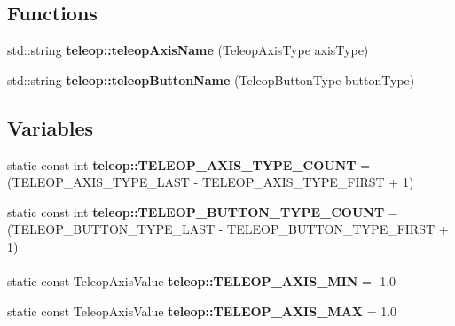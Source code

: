 \subsection*{Functions}
\begin{DoxyCompactItemize}
\item 
std::string {\bf teleop::teleopAxisName} (TeleopAxisType axisType)
\item 
std::string {\bf teleop::teleopButtonName} (TeleopButtonType buttonType)
\end{DoxyCompactItemize}
\subsection*{Variables}
\begin{DoxyCompactItemize}
\item 
static const int {\bf teleop::TELEOP\_\-AXIS\_\-TYPE\_\-COUNT} = (TELEOP\_\-AXIS\_\-TYPE\_\-LAST -\/ TELEOP\_\-AXIS\_\-TYPE\_\-FIRST + 1)
\item 
static const int {\bf teleop::TELEOP\_\-BUTTON\_\-TYPE\_\-COUNT} = (TELEOP\_\-BUTTON\_\-TYPE\_\-LAST -\/ TELEOP\_\-BUTTON\_\-TYPE\_\-FIRST + 1)
\end{DoxyCompactItemize}
\paragraph*{}
\begin{DoxyCompactItemize}
\item 
static const TeleopAxisValue {\bf teleop::TELEOP\_\-AXIS\_\-MIN} = -\/1.0
\item 
static const TeleopAxisValue {\bf teleop::TELEOP\_\-AXIS\_\-MAX} = 1.0
\end{DoxyCompactItemize}


